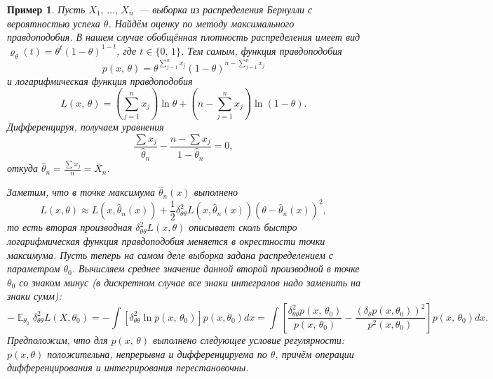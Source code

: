 \documentclass[12pt]{article}
\DeclareMathOperator{\mexp}{\mathbb{E}}
\newtheorem*{example*}{Пример}
\begin{document}
    \begin{example*}
        Пусть $X_1,\, \ldots ,\, X_n$~--- выборка из распределения Бернулли с вероятностью успеха $\theta$. Найдём оценку по методу максимального правдоподобия. В нашем случае обобщённая плотность распределения имеет вид $\varrho_\theta(t) = \theta^t(1 - \theta)^{1-t}$, где $t \in \{0,\, 1\}$. Тем самым, функция правдоподобия 
        \begin{equation*}
            p(x,\, \theta) = \theta^{\sum_{j=1}^n x_j} (1 - \theta)^{n - \sum_{j=1}^n x_j}
        \end{equation*}
        и логарифмическая функция правдоподобия
        \begin{equation*}
            L(x,\, \theta) = \left(\sum_{j=1}^n x_j\right) \ln \theta + \left(n - \sum_{j=1}^n x_j\right) \ln(1 - \theta).
        \end{equation*}
        Дифференцируя, получаем уравнения
        \begin{equation*}
            \frac{\sum x_j}{\widehat{\theta}_n} - \frac{n - \sum x_j}{1 - \widehat{\theta}_n} = 0,
        \end{equation*}
        откуда $\widehat{\theta}_n = \frac{\sum x_j}{n} = \bar{X}_n$.

        Заметим, что в точке максимума $\widehat{\theta}_n(x)$ выполнено
        \begin{equation*}
            L(x, \theta) \approx L(x, \widehat{\theta}_n(x)) + \frac{1}{2}\delta_{\theta \theta}^2 L(x, \widehat{\theta}_n(x))(\theta - \widehat{\theta}_n(x))^2,
        \end{equation*}
        то есть вторая производная $\delta_{\theta \theta}^2 L(x, \theta)$ описывает сколь быстро логарифмическая функция правдоподобия меняется в окрестности точки максимума. Пусть теперь на самом деле выборка задана распределением с параметром $\theta_0$. Вычисляем среднее значение данной второй производной в точке $\theta_0$ со знаком минус (в дискретном случае все знаки интегралов надо заменить на знаки сумм):
        \begin{equation*}
            -\mexp_{\theta_0} \delta_{\theta \theta}^2 L(X, \theta_0) = -\int \left[\delta_{\theta \theta}^2 \ln p(x,\, \theta_0)\right] p(x, \theta_0) dx = \int \left[\frac{\delta_{\theta \theta}^2 p(x,\, \theta_0)}{p(x,\, \theta_0)} - \frac{(\delta_\theta p(x, \theta_0))^2}{p^2(x, \theta_0)}\right] p(x,\, \theta_0) dx.
        \end{equation*}
        Предположим, что для $p(x,\, \theta)$ выполнено следующее условие регулярности: $p(x, \theta)$ положительна, непрерывна и дифференцируема по $\theta$, причём операции дифференцирования и интегрирования перестановочны.


\end{example*}
\end{document}
